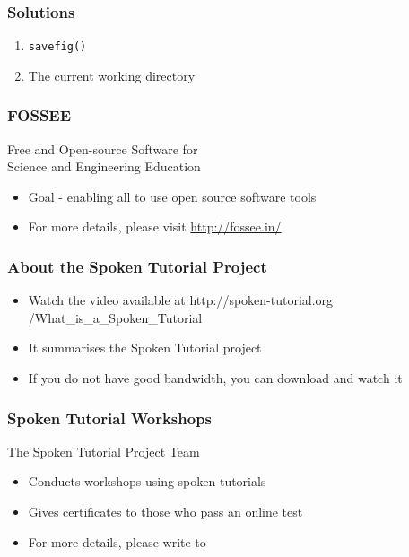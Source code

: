 \documentclass[17pt,compress]{beamer}
\begin{document}
\begin{frame}
\frametitle{Solutions}
\label{sec-11}
\begin{enumerate}
\item \texttt{savefig()}\pause
\item The current working directory
\end{enumerate}
\end{frame}
\begin{frame}
\frametitle{FOSSEE}
{\color{blue}Free and Open-source Software for \\Science and Engineering Education} \\
\begin{itemize}
\item Goal - enabling all to use open source software tools
\item For more details, please visit {\color{blue}\url{http://fossee.in/}}
\end{itemize}
\end{frame}
\begin{frame}
\frametitle{About the Spoken Tutorial Project}
\begin{itemize}
\item Watch the video available at {\color{blue}http://spoken-tutorial.org /What\_is\_a\_Spoken\_Tutorial}
\item It summarises the Spoken Tutorial project \pause
\item If you do not have good bandwidth, you can download and watch it
\end{itemize}
\end{frame}
\begin{frame}
\frametitle{Spoken Tutorial Workshops}The Spoken Tutorial Project Team 
\begin{itemize}
\item Conducts workshops using spoken tutorials 
\item Gives certificates to those who pass an online test 
\item For more details, please write to \\ 
\end{itemize}
\end{frame}
\end{document}

